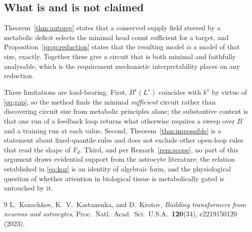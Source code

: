 \subsection{What is and is not claimed}

Theorem~\ref{thm:autoreg} states that a conserved supply field steered by a metabolic
deficit selects the minimal head count sufficient for a target, and
Proposition~\ref{prop:reduction} states that the resulting model \emph{is} a model of
that size, exactly. Together these give a circuit that is both minimal and faithfully
analysable, which is the requirement mechanistic interpretability places on any reduction.

Three limitations are load-bearing. First, $B^\star(L^\star)$ coincides with $k^\star$ by
virtue of \eqref{eq:gap}, so the method finds the minimal \emph{sufficient} circuit rather
than discovering circuit size from metabolic principles alone; the substantive content is
that one run of a feedback loop returns what otherwise requires a sweep over $B$ and a
training run at each value. Second, Theorem~\ref{thm:impossible} is a statement about
fixed-quantile rules and does not exclude other open-loop rules that read the shape of
$F_d$. Third, and per Remark~\ref{rem:scope}, no part of this argument draws evidential
support from the astrocyte literature; the relation established in \eqref{eq:koz} is an
identity of algebraic form, and the physiological question of whether attention in
biological tissue is metabolically gated is untouched by it.

\begin{thebibliography}{9}
L.~Kozachkov, K.~V.~Kastanenka, and D.~Krotov,
\emph{Building transformers from neurons and astrocytes},
Proc.\ Natl.\ Acad.\ Sci.\ U.S.A.\ \textbf{120}(34), e2219150120 (2023).
\end{thebibliography}
